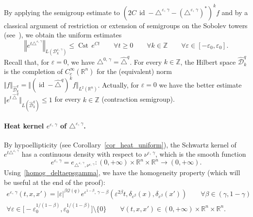 \documentclass[AHL,Unicode,published]{cedram}
\newcommand*\R{\mathbb{R}}
\newcommand*\Z{\mathbb{Z}}
\newcommand{\calQ}{\mathcal{Q}}
\newcommand{\calD}{\mathcal{D}}
\DeclareMathOperator{\Cst}{Cst}
\DeclareMathOperator{\id}{id}
\renewcommand{\geq}{\geqslant}
\renewcommand{\leq}{\leqslant}
\let\oldforall\forall
\renewcommand*{\forall}{\mathrel{\oldforall}}
\begin{document}
By applying the semigroup estimate to $(2C\,\id-\triangle^{\varepsilon,\,\gamma}-(\triangle^{\varepsilon,\,\gamma})^*)^k f$ and by a classical argument of restriction or extension of semigroups on the Sobolev towers (see~\cite{EngelNagel}), we obtain the uniform estimates
\begin{equation}\label{ineg_contraction_epsgamma}
\left\Vert e^{t\triangle^{\varepsilon,\,\gamma}}\right\Vert_{L\left(\calD^{\varepsilon,\,\gamma}_k\right)}\leq \Cst\, e^{Ct}\qquad \forall t\geq 0\qquad \forall k\in\Z \qquad\forall\varepsilon\in[-\varepsilon_0,\varepsilon_0].
\end{equation}
Recall that, for $\varepsilon=0$, we have $\triangle^{0,\,\gamma}=\widehat{\triangle}^{q}$. For every $k\in\Z$, the Hilbert space $\widehat{\calD}^{q}_k$ is the completion of $C_c^\infty(\R^n)$ for the (equivalent) norm $\Vert f\Vert_{\widehat{\calD}^{q}_k} = \Vert (\id-\widehat{\triangle}^{q})^kf\Vert_{L^2(\R^n)}$. Actually, for $\varepsilon=0$ we have the better estimate $\Vert e^{t \,\widehat{\triangle}^{q}}\Vert_{L(\widehat{\calD}^{q}_k)}\leq 1$ for every $k\in\Z$ (contraction semigroup).



\paragraph{Heat kernel $e^{\varepsilon,\,\gamma}$ of $\triangle^{\varepsilon,\,\gamma}$.}
By hypoellipticity (see Corollary~\ref{cor_heat_uniform}), the Schwartz kernel of $e^{t\triangle^{\varepsilon,\,\gamma}}$ has a continuous density with respect to $\nu^{\varepsilon,\,\gamma}$, which is the smooth function
\[
e^{\varepsilon,\,\gamma} = e_{\triangle^{\varepsilon,\,\gamma},\nu^{\varepsilon,\,\gamma}}: (0,+\infty)\times \R^n\times\R^n\rightarrow(0,+\infty).
\]
Using~\eqref{homog_deltaepsgamma}, we have the homogeneity property (which will be useful at the end of the proof):
\begin{multline}\label{homog_eepsgamma}
e^{\varepsilon,\,\gamma}(t,x,x') = \vert\varepsilon\vert^{\beta\calQ(q)} e^{\varepsilon^{1-\beta},\,\gamma-\beta} \left(\varepsilon^{2\beta} t, \delta_{\varepsilon^\beta}(x), \delta_{\varepsilon^\beta}(x')\right)
\qquad \forall\beta\in(\gamma,1-\gamma)\\
\forall \varepsilon\in \big[-\varepsilon_0^{1/(1-\beta)},\varepsilon_0^{1/(1-\beta)} \big] \setminus\{0\}\qquad \forall (t,x,x')\in (0,+\infty)\times\R^n\times\R^n.
\end{multline}
\end{document}

